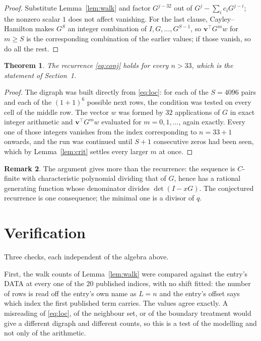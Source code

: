 \documentclass[11pt,a4paper]{article}
\theoremstyle{plain}
\newtheorem{theorem}{Theorem}
\theoremstyle{definition}
\newtheorem{remark}[theorem]{Remark}
\begin{document}
\begin{proof}
Substitute Lemma~\ref{lem:walk} and factor $G^{j-32}$ out of
$G^{j}-\sum_ic_iG^{j-i}$; the nonzero scalar $1$ does not affect
vanishing. For the last clause, Cayley--Hamilton makes $G^{S}$ an integer combination of
$I,G,\dots,G^{S-1}$, so $\mathbf{v}^{\!\top}G^{m}w$ for $m\ge S$ is the corresponding
combination of the earlier values; if those vanish, so do all the rest.
\end{proof}

\begin{theorem}
The recurrence \eqref{eq:conj} holds for every $n>33$, which is the statement of
Section~1.
\end{theorem}

\begin{proof}
The digraph was built directly from \eqref{eq:loc}: for each of the $S=4096$ pairs and each
of the $(1+1)^{6}$ possible next rows, the condition was tested on every cell of
the middle row. The vector $w$ was formed by $32$ applications of $G$ in exact integer
arithmetic and $\mathbf{v}^{\!\top}G^{m}w$ evaluated for $m=0,1,\dots$, again exactly.
Every one of those integers vanishes from the index corresponding to $n=33+1$ onwards,
and the run was continued until $S+1$ consecutive zeros had been seen, which by
Lemma~\ref{lem:crit} settles every larger $m$ at once.
\end{proof}

\begin{remark}
The argument gives more than the recurrence: the sequence is $C$-finite with characteristic
polynomial dividing that of $G$, hence has a rational generating function whose denominator
divides $\det(I-xG)$. The conjectured recurrence is one consequence; the minimal one is a
divisor of $q$.
\end{remark}

\section{Verification}

Three checks, each independent of the algebra above.

First, the walk counts of Lemma~\ref{lem:walk} were compared against the entry's DATA at
every one of the $20$ published indices, with no shift fitted: the number of rows is
read off the entry's own name as $L=n$ and the entry's offset says which index the first
published term carries. The values agree exactly. A misreading of \eqref{eq:loc}, of the
neighbour set, or of the boundary treatment would give a different digraph and different
counts, so this is a test of the modelling and not only of the arithmetic.
\end{document}
